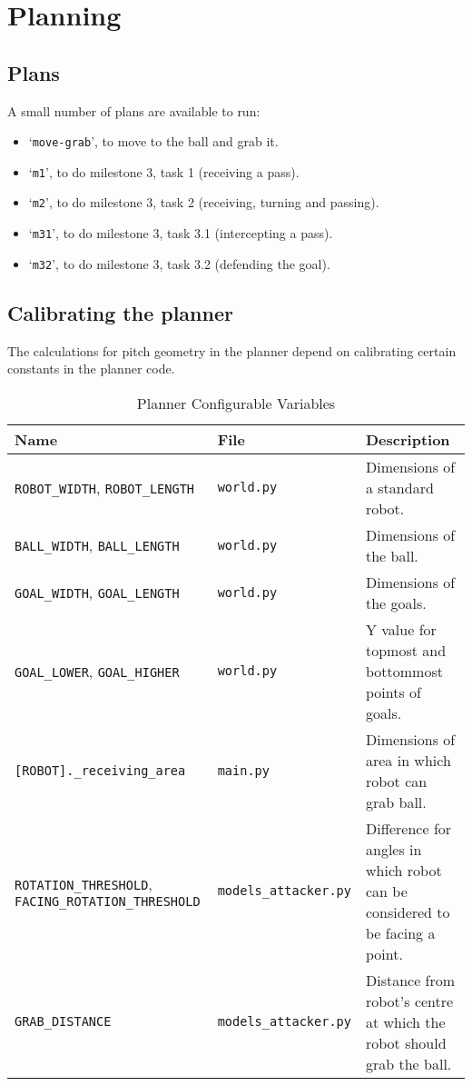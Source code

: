 \section{Planning}

\subsection{Plans}

A small number of plans are available to run:

\begin{itemize}
    \item `\texttt{move-grab}', to move to the ball and grab it.
    \item `\texttt{m1}', to do milestone 3, task 1 (receiving a pass).
    \item `\texttt{m2}', to do milestone 3, task 2 (receiving, turning and passing).
    \item `\texttt{m31}', to do milestone 3, task 3.1 (intercepting a pass).
    \item `\texttt{m32}', to do milestone 3, task 3.2 (defending the goal).
\end{itemize}


\subsection{Calibrating the planner}

The calculations for pitch geometry in the planner depend on calibrating certain constants in the planner code.


\begin{table}[H]
\begin{tabularx}{\textwidth}{ XlX }
\toprule
\textbf{Name} & \textbf{File} & \textbf{Description} \\
\midrule
\verb|ROBOT_WIDTH|, \verb|ROBOT_LENGTH| & \texttt{world.py} & Dimensions of a standard robot. \\
\verb|BALL_WIDTH|, \verb|BALL_LENGTH| & \texttt{world.py} & Dimensions of the ball. \\
\verb|GOAL_WIDTH|, \verb|GOAL_LENGTH| & \texttt{world.py} & Dimensions of the goals. \\
\verb|GOAL_LOWER|, \verb|GOAL_HIGHER| & \texttt{world.py} & Y value for topmost and bottommost points of goals. \\
\verb|[ROBOT]._receiving_area| & \texttt{main.py} & Dimensions of area in which robot can grab ball. \\
\verb|ROTATION_THRESHOLD|, \verb|FACING_ROTATION_THRESHOLD| &\texttt{models\_attacker.py} & Difference for angles in which robot can be considered to be facing a point. \\
\verb|GRAB_DISTANCE| & \texttt{models\_attacker.py} & Distance from robot's centre at which the robot should grab the ball. \\
\bottomrule
\end{tabularx}
\caption{Planner Configurable Variables}
\end{table}
